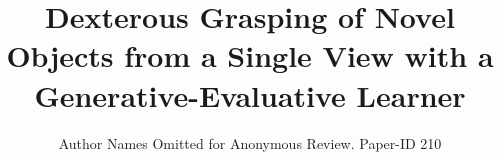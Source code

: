 \documentclass[conference]{IEEEtrans}
\begin{document}
\title{Dexterous Grasping of Novel Objects from a Single View with a Generative-Evaluative Learner}

\author{Author Names Omitted for Anonymous Review. Paper-ID 210}





% 


\maketitle
\end{document}
